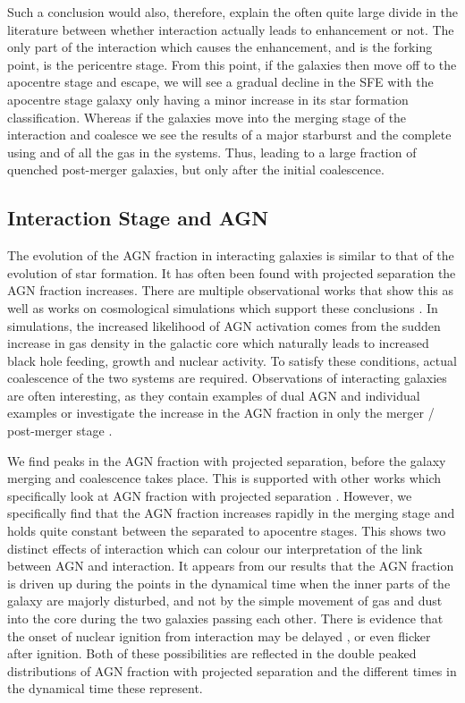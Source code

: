 Such a conclusion would also, therefore, explain the often quite large divide in the literature between whether interaction actually leads to enhancement or not. The only part of the interaction which causes the enhancement, and is the forking point, is the pericentre stage. From this point, if the galaxies then move off to the apocentre stage and escape, we will see a gradual decline in the SFE with the apocentre stage galaxy only having a minor increase in its star formation classification. Whereas if the galaxies move into the merging stage of the interaction and coalesce we see the results of a major starburst and the complete using and of all the gas in the systems. Thus, leading to a large fraction of quenched post-merger galaxies, but only after the initial coalescence. 

\subsection{Interaction Stage and AGN}
\noindent The evolution of the AGN fraction in interacting galaxies is similar to that of the evolution of star formation. It has often been found with projected separation the AGN fraction increases. There are multiple observational works that show this \citep{2007MNRAS.375.1017A, 2013MNRAS.435.3627E, 2020ApJ...904..107S} as well as works on cosmological simulations which support these conclusions \citep{2023MNRAS.519.4966B}. In simulations, the increased likelihood of AGN activation comes from the sudden increase in gas density in the galactic core which naturally leads to increased black hole feeding, growth and nuclear activity. To satisfy these conditions, actual coalescence of the two systems are required. Observations of interacting galaxies are often interesting, as they contain examples of dual AGN and individual examples \citep[e.g.][]{2017MNRAS.470L..49E, 2021ApJ...923...36S} or investigate the increase in the AGN fraction in only the merger / post-merger stage \citep{2020A&A...637A..94G}.

We find peaks in the AGN fraction with projected separation, before the galaxy merging and coalescence takes place. This is supported with other works which specifically look at AGN fraction with projected separation \citep{2011MNRAS.418.2043E, 2023ApJ...942..107S}. However, we specifically find that the AGN fraction increases rapidly in the merging stage and holds quite constant between the separated to apocentre stages. This shows two distinct effects of interaction which can colour our interpretation of the link between AGN and interaction. It appears from our results that the AGN fraction is driven up during the points in the dynamical time when the inner parts of the galaxy are majorly disturbed, and not by the simple movement of gas and dust into the core during the two galaxies passing each other. There is evidence that the onset of nuclear ignition from interaction may be delayed \citep{2011MNRAS.418.2043E}, or even flicker \citep{2015MNRAS.451.2517S} after ignition. Both of these possibilities are reflected in the double peaked distributions of AGN fraction with projected separation and the different times in the dynamical time these represent.

